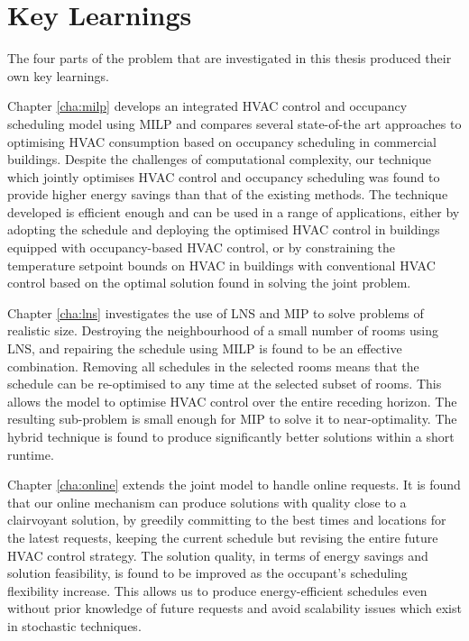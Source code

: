\section{Key Learnings}

The four parts of the problem that are investigated in this thesis produced their own key learnings.

Chapter \ref{cha:milp} develops an integrated HVAC control and occupancy scheduling model using MILP and compares several state-of-the art approaches to optimising HVAC consumption based on occupancy scheduling in commercial buildings. Despite the challenges of computational complexity, our technique which jointly optimises HVAC control and occupancy scheduling was found to provide higher energy savings than that of the existing methods. The technique developed is efficient enough and can be used in a range of applications, either by adopting the schedule and deploying the optimised HVAC control in buildings equipped with occupancy-based HVAC control, or by constraining the temperature setpoint bounds on HVAC in buildings with conventional HVAC control based on the optimal solution found in solving the joint problem.

Chapter \ref{cha:lns} investigates the use of LNS and MIP to solve problems of realistic size. Destroying the neighbourhood of a small number of rooms using LNS, and repairing the schedule using MILP is found to be an effective combination. Removing all schedules in the selected rooms means that the schedule can be re-optimised to any time at the selected subset of rooms. This allows the model to optimise HVAC control over the entire receding horizon. The resulting sub-problem is small enough for MIP to solve it to near-optimality. The hybrid technique is found to produce significantly better solutions within a short runtime.

Chapter \ref{cha:online} extends the joint model to handle online requests. It is found that our online mechanism can produce solutions with quality close to a clairvoyant solution, by greedily committing to the best times and locations for the latest requests, keeping the current schedule but revising the entire future HVAC control strategy. The solution quality, in terms of energy savings and solution feasibility, is found to be improved as the occupant's scheduling flexibility increase. This allows us to produce energy-efficient schedules even without prior knowledge of future requests and avoid scalability issues which exist in stochastic techniques.


